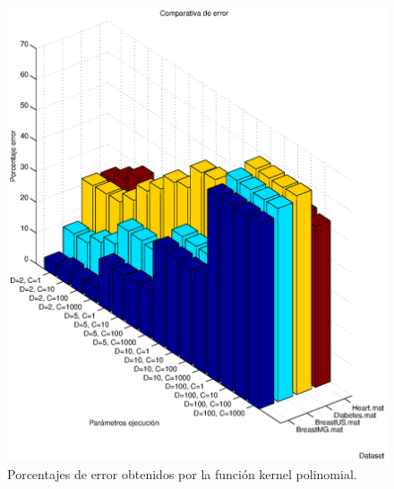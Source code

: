 \documentclass[spanish,12pt]{article}
\begin{document}
\begin{figure}
        \centering
        \includegraphics[width=\textwidth]{imagenes/polinomial-error}
        \caption{Porcentajes de error obtenidos por la función kernel polinomial.}\label{fig:polinomial-error}
\end{figure}
\end{document}

